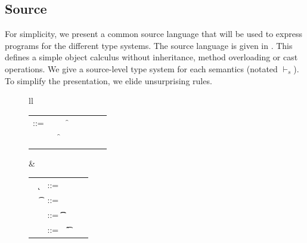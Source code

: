 \documentclass[USenglish]{tex/lipics-v2016}
\begin{document}
\subsection{Source}

For simplicity, we present a common source language that will be used to
express programs for the different type systems.  The source language is
given in . This defines a simple object calculus
without inheritance, method overloading or cast operations. We give a
source-level type system for each semantics (notated $\vdash_{\!s}$). To
simplify the presentation, we elide unsurprising rules.

\begin{figure}[!h]\hrulefill

\begin{tabular}{ll}
\begin{minipage}{6cm}\begin{tabular}{@{}l@{~}l@{}l@{}l@{}l@{}l@{}l@{}l}
\e\hspace{.1cm} ::= & \hspace{.2cm} \x        
		    &\B \this         
		    &\B \FRead\f \\&
		    &\B \FWrite\f\e
		    &\B \Call\e\m\e \\& 
                    &\B \that      
		   &\B \New\C{\e[1]..}  
\end{tabular}\end{minipage}&
\begin{minipage}{5cm}\begin{tabular}{l@{~}l@{}l@{}l}
		~ \k &::= \Class \C {\fd[1]..}{\md[1]..} \\
		~ \t&::= ~ \any  \B   \C  \\ 
		\md &::= \Mdef\m\x\t\t\e \\
		~\fd&::= ~ \Fdef\f\t \\ 
\end{tabular}\end{minipage} 
\end{tabular}

\hspace{-.5cm}\begin{mathpar}



\end{mathpar}
\end{figure}
\end{document}
